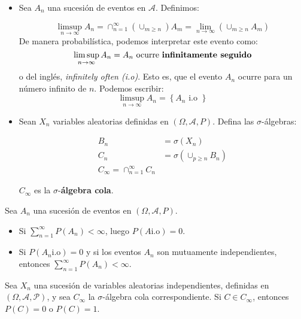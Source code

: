 \begin{boxDef}
	\begin{itemize}
		\item Sea $A_n$ una sucesión de eventos en $\mathcal{A}$. Definimos:

		\[
			\limsup_{n \rightarrow \infty } A_n = \cap_{n = 1}^{\infty} (\cup_{m \geq n}) A_m = \lim_{n \rightarrow \infty} (\cup_{m \geq n} A_m)
		\]
		De manera probabilística, podemos interpretar este evento como:
		\[
			\limsup_{n \rightarrow \infty} A_n = A_n \text{ ocurre \textbf{infinitamente seguido}}
		\]
		o del inglés, \textit{infinitely often (i.o)}. Esto es, que el evento $A_n$ ocurre para un número infinito de $n$. Podemos escribir:
		\[
			\limsup_{n \rightarrow \infty} A_n = \left\{ A_n \text{ i.o } \right\}
		\]

		\item Sean $X_n$ variables aleatorias definidas en $(\Omega, \mathcal{A}, P)$. Defina las $\sigma$-álgebras:

		\begin{align*}
			B_n &= \sigma(X_n)\\
			C_n &= \sigma(\cup_{p \geq n} B_n)\\
			C_{\infty} = \cap_{n=1}^{\infty} C_n
		\end{align*}

		$C_{\infty}$ es la $\sigma$-\textbf{álgebra cola}.

	\end{itemize}
\end{boxDef}


\begin{theorem}
	Sea $A_n$ una sucesión de eventos en $(\Omega, \mathcal{A}, P)$.

	\begin{itemize}
		\item Si $\sum_{n = 1}^{\infty} P(A_n) < \infty$, luego $P(A \text{i.o}) = 0$.
		\item Si $P(A_n \text{i.o}) = 0$ y si los eventos $A_n$ son mutuamente independientes, entonces $\sum_{n = 1}^{\infty} P(A_n) < \infty$. 
	\end{itemize}

\end{theorem}


\begin{theorem}
	Sea $X_n$ una sucesión de variables aleatorias independientes, definidas en $(\Omega, \mathcal{A, P})$, y sea $C_{\infty}$ la $\sigma$-álgebra cola correspondiente. Si $C \in C_{\infty}$, entonces $P(C) = 0$ o $P(C) = 1$.
\end{theorem}






